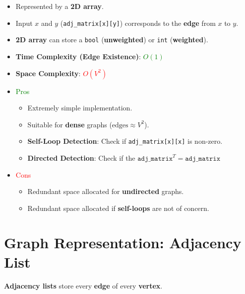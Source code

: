 \documentclass[12pt, letterpaper]{article}
\begin{document}
\begin{itemize}
    \item Represented by a \textbf{2D array}.
    \item Input $ x $ and $ y $ (\texttt{adj\_matrix[x][y]}) corresponds to the \textbf{edge} from $ x $ to $ y $.
    \item \textbf{2D array} can store a \texttt{bool} (\textbf{unweighted}) or \texttt{int} (\textbf{weighted}).
    \item \textbf{Time Complexity (Edge Existence)}: \textcolor{green}{$ O(1) $}
    \item \textbf{Space Complexity}: \textcolor{red}{$ O(V^2) $}
    \item \textcolor{green}{Pros}
        \begin{itemize}
            \item Extremely simple implementation.
            \item Suitable for \textbf{dense} graphs ($ \textrm{edges} \approx V^2 $).
            \item \textbf{Self-Loop Detection}: Check if \texttt{adj\_matrix[x][x]} is non-zero.
            \item \textbf{Directed Detection}: Check if the $ \texttt{adj\_matrix}^T = \texttt{adj\_matrix} $
        \end{itemize}
    \item \textcolor{red}{Cons}
        \begin{itemize}
            \item Redundant space allocated for \textbf{undirected} graphs.
            \item Redundant space allocated if \textbf{self-loops} are not of concern.
        \end{itemize}
\end{itemize}

\section*{Graph Representation: Adjacency List}

\textbf{Adjacency lists} store every \textbf{edge} of every \textbf{vertex}.
\end{document}
